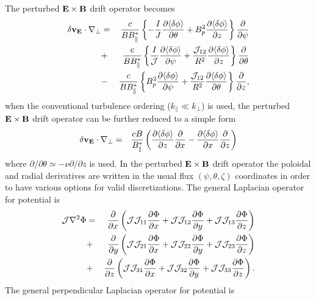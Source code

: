 \documentclass [11pt]{article}
\begin{document}
The perturbed ${\bf E}\times {\bf B}$ drift operator becomes
\begin{eqnarray}
{\delta\bf v_E}\cdot\nabla_\perp&=&
{c\over BB_\|^*}\left\{
-{I\over J}{\partial\langle\delta\phi\rangle\over\partial\theta}
+{B_p^2}
{\partial\langle\delta\phi\rangle\over\partial z}
\right\}{\partial\over\partial\psi} \nonumber\\
&+&{c\over BB_\|^*}\left\{{I\over{\cal J}}
{\partial\langle\delta\phi\rangle\over\partial\psi}
+{{\cal J}_{12}\over R^2}
{\partial\langle\delta\phi\rangle\over\partial z}
\right\}{\partial\over\partial\theta} \nonumber\\
&-&{c\over BB_\|^*}\left\{B_p^2
{\partial\langle\delta\phi\rangle\over\partial\psi}
+{{\cal J}_{12}\over R^2}
{\partial\langle\delta\phi\rangle\over\partial\theta}
\right\}{\partial\over\partial z},
\end{eqnarray}
when the conventional turbulence ordering ($k_\|\ll k_\perp$) is used, the 
perturbed ${\bf E}\times {\bf B}$ drift operator can be further reduced to a simple form
\begin{eqnarray}
{\delta\bf v_E}\cdot\nabla_\perp&=&
{cB\over B_\|^*}\left(
{\partial\langle\delta\phi\rangle\over\partial z}{\partial\over\partial x}
-{\partial\langle\delta\phi\rangle\over\partial x}{\partial\over\partial z}\right)
\end{eqnarray}
where $\partial/\partial\theta\simeq -\nu\partial/\partial z$ is used.
In the perturbed ${\bf E}\times {\bf B}$ drift operator the poloidal and radial derivatives 
are written in 
the usual flux $(\psi,\theta,\zeta)$ coordinates in order to have various options for valid discretizations. 
The general Laplacian operator for potential is
\begin{eqnarray}
{\cal J}\nabla^2\Phi&=&{\partial\over\partial x}\left({\cal J}{\cal J}_{11}{\partial\Phi\over\partial x}
+{\cal J}{\cal J}_{12}{\partial\Phi\over\partial y}
+{\cal J}{\cal J}_{13}{\partial\Phi\over\partial z}\right) \nonumber\\
&+&{\partial\over\partial y}\left({\cal J}{\cal J}_{21}{\partial\Phi\over\partial x}
+{\cal J}{\cal J}_{22}{\partial\Phi\over\partial y}
+{\cal J}{\cal J}_{23}{\partial\Phi\over\partial z}\right) \nonumber\\
&+&{\partial\over\partial z}\left({\cal J}{\cal J}_{31}{\partial\Phi\over\partial x}
+{\cal J}{\cal J}_{32}{\partial\Phi\over\partial y}
+{\cal J}{\cal J}_{33}{\partial\Phi\over\partial z}\right).
\end{eqnarray}
The general perpendicular Laplacian operator for potential is
\end{document}
